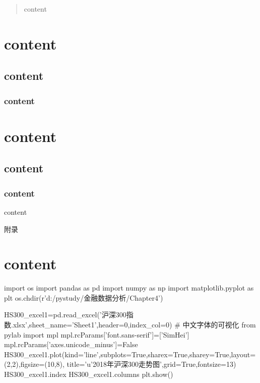 \documentclass{MathorCupmodeling}
\begin{document}
	\begin{abstract}
		content
	\end{abstract}
	\tableofcontents\newpage
	\section{content}
	\subsection{content}
	\subsubsection{content}
	\section{content}
	\subsection{content}
	\subsubsection{content}
	
	\begin{thebibliography}{99}
		content
	\end{thebibliography}
	
	\newpage
	\appendix
	\begin{center}
		\heiti{} 附\hspace{1pc}录
	\end{center}
	\section{content}
	\begin{python}
		import os
		import pandas as pd
		import numpy as np
		import matplotlib.pyplot as plt
		os.chdir(r'd:/pystudy/金融数据分析/Chapter4')
		
		HS300_excel1=pd.read_excel('沪深300指数.xlsx',sheet_name='Sheet1',header=0,index_col=0)
		# 中文字体的可视化
		from pylab import mpl
		mpl.rcParams['font.sans-serif']=['SimHei']
		mpl.rcParams['axes.unicode_minus']=False
		HS300_excel1.plot(kind='line',subplots=True,sharex=True,sharey=True,layout=(2,2),figsize=(10,8),
		title='u’2018年沪深300走势图',grid=True,fontsize=13)
		HS300_excel1.index
		HS300_excel1.columns
		plt.show()
	\end{python}
\end{document}
